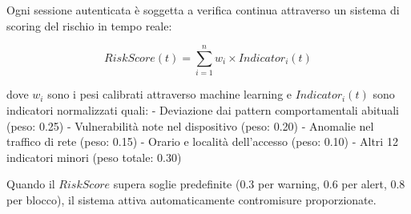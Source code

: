 Ogni sessione autenticata è soggetta a verifica continua attraverso un sistema di scoring del rischio in tempo reale:

\begin{equation}
RiskScore(t) = \sum_{i=1}^{n} w_i \times Indicator_i(t)
\end{equation}

dove $w_i$ sono i pesi calibrati attraverso machine learning e $Indicator_i(t)$ sono indicatori normalizzati quali:
- Deviazione dai pattern comportamentali abituali (peso: 0.25)
- Vulnerabilità note nel dispositivo (peso: 0.20)
- Anomalie nel traffico di rete (peso: 0.15)
- Orario e località dell'accesso (peso: 0.10)
- Altri 12 indicatori minori (peso totale: 0.30)

Quando il $RiskScore$ supera soglie predefinite (0.3 per warning, 0.6 per alert, 0.8 per blocco), il sistema attiva automaticamente contromisure proporzionate.







